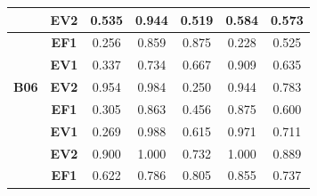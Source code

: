 \begin{table}[htbp]
\begin{tabular}{|ccccccc|}
		\rowcolor[HTML]{F2F2F2} 
		\multicolumn{1}{|c|}{\multirow{-3}{*}{\cellcolor[HTML]{F2F2F2}\textbf{B05}}} & \multicolumn{1}{c|}{\cellcolor[HTML]{F2F2F2}\textbf{EV2}} & \multicolumn{1}{c|}{\cellcolor[HTML]{F2F2F2}0.535} & \multicolumn{1}{c|}{\cellcolor[HTML]{F2F2F2}0.944} & \multicolumn{1}{c|}{\cellcolor[HTML]{F2F2F2}0.519} & \multicolumn{1}{c|}{\cellcolor[HTML]{F2F2F2}0.584} & 0.573 \\ \hline
		\multicolumn{1}{|c|}{\cellcolor[HTML]{F2F2F2}} & \multicolumn{1}{c|}{\textbf{EF1}} & \multicolumn{1}{c|}{0.256} & \multicolumn{1}{c|}{0.859} & \multicolumn{1}{c|}{0.875} & \multicolumn{1}{c|}{0.228} & 0.525 \\ \cline{2-7} 
		\rowcolor[HTML]{F2F2F2} 
		\multicolumn{1}{|c|}{\cellcolor[HTML]{F2F2F2}} & \multicolumn{1}{c|}{\cellcolor[HTML]{F2F2F2}\textbf{EV1}} & \multicolumn{1}{c|}{\cellcolor[HTML]{F2F2F2}0.337} & \multicolumn{1}{c|}{\cellcolor[HTML]{F2F2F2}0.734} & \multicolumn{1}{c|}{\cellcolor[HTML]{F2F2F2}0.667} & \multicolumn{1}{c|}{\cellcolor[HTML]{F2F2F2}0.909} & 0.635 \\ \cline{2-7} 
		\multicolumn{1}{|c|}{\multirow{-3}{*}{\cellcolor[HTML]{F2F2F2}\textbf{B06}}} & \multicolumn{1}{c|}{\textbf{EV2}} & \multicolumn{1}{c|}{0.954} & \multicolumn{1}{c|}{0.984} & \multicolumn{1}{c|}{0.250} & \multicolumn{1}{c|}{0.944} & 0.783 \\ \hline
		\rowcolor[HTML]{F2F2F2} 
		\multicolumn{1}{|c|}{\cellcolor[HTML]{F2F2F2}} & \multicolumn{1}{c|}{\cellcolor[HTML]{F2F2F2}\textbf{EF1}} & \multicolumn{1}{c|}{\cellcolor[HTML]{F2F2F2}0.305} & \multicolumn{1}{c|}{\cellcolor[HTML]{F2F2F2}0.863} & \multicolumn{1}{c|}{\cellcolor[HTML]{F2F2F2}0.456} & \multicolumn{1}{c|}{\cellcolor[HTML]{F2F2F2}0.875} & 0.600 \\ \cline{2-7} 
		\multicolumn{1}{|c|}{\cellcolor[HTML]{F2F2F2}} & \multicolumn{1}{c|}{\textbf{EV1}} & \multicolumn{1}{c|}{0.269} & \multicolumn{1}{c|}{0.988} & \multicolumn{1}{c|}{0.615} & \multicolumn{1}{c|}{0.971} & 0.711 \\ \cline{2-7} 
		\rowcolor[HTML]{F2F2F2} 
		\multicolumn{1}{|c|}{\multirow{-3}{*}{\cellcolor[HTML]{F2F2F2}\textbf{B08}}} & \multicolumn{1}{c|}{\cellcolor[HTML]{F2F2F2}\textbf{EV2}} & \multicolumn{1}{c|}{\cellcolor[HTML]{F2F2F2}0.900} & \multicolumn{1}{c|}{\cellcolor[HTML]{F2F2F2}1.000} & \multicolumn{1}{c|}{\cellcolor[HTML]{F2F2F2}0.732} & \multicolumn{1}{c|}{\cellcolor[HTML]{F2F2F2}1.000} & 0.889 \\ \hline
		\multicolumn{1}{|c|}{\cellcolor[HTML]{F2F2F2}} & \multicolumn{1}{c|}{\textbf{EF1}} & \multicolumn{1}{c|}{0.622} & \multicolumn{1}{c|}{0.786} & \multicolumn{1}{c|}{0.805} & \multicolumn{1}{c|}{0.855} & 0.737 \\ \cline{2-7} 

\end{tabular}
\end{table}
